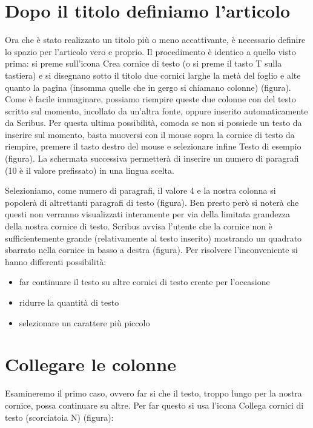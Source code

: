 \documentclass[a4paper, 12pt]{book}
\begin{document}
\section{Dopo il titolo definiamo l'articolo}
Ora che è stato realizzato un titolo più o meno accattivante, è necessario definire lo spazio per l'articolo vero e proprio. Il procedimento è identico a quello visto prima: si preme sull'icona Crea cornice di testo (o si preme il tasto T sulla tastiera) e si disegnano sotto il titolo due cornici larghe la metà del foglio e alte quanto la pagina (insomma quelle che in gergo si chiamano colonne) (figura). Come è facile immaginare, possiamo riempire queste due colonne con del testo scritto sul momento, incollato da un'altra fonte, oppure inserito automaticamente da Scribus. Per questa ultima possibilità, comoda se non si possiede un testo da inserire sul momento, basta muoversi con il mouse sopra la cornice di testo da riempire, premere il tasto destro del mouse e selezionare infine Testo di esempio (figura). La schermata successiva permetterà di inserire un numero di paragrafi (10 è il valore prefissato) in una lingua scelta. 

Selezioniamo, come numero di paragrafi, il valore 4 e la nostra colonna si popolerà di altrettanti paragrafi di testo (figura). Ben presto però si noterà che questi non verranno visualizzati interamente per via della limitata grandezza della nostra cornice di testo. Scribus avvisa l'utente che la cornice non è sufficientemente grande (relativamente al testo inserito) mostrando un quadrato sbarrato nella cornice in basso a destra (figura). Per risolvere l'inconveniente si hanno differenti possibilità:

\begin{itemize}
	\item far continuare il testo su altre cornici di testo create per l'occasione

	\item ridurre la quantità di testo

	\item selezionare un carattere più piccolo
\end{itemize}

\section{Collegare le colonne}
Esamineremo il primo caso, ovvero far si che il testo, troppo lungo per la nostra cornice, possa continuare su altre. Per far questo si usa l'icona Collega cornici di testo (scorciatoia N) (figura):
\end{document}

